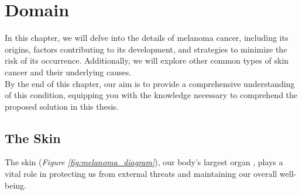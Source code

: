 \chapter{Domain}
\label{cap:problem_domain}

In this chapter, we will delve into the details of melanoma cancer, including its origins,
factors contributing to its development, and strategies to minimize the risk of its occurrence.
Additionally, we will explore other common types of skin cancer and their underlying causes. \\

By the end of this chapter, our aim is to provide a comprehensive understanding of this condition,
equipping you with the knowledge necessary to comprehend the proposed solution in this thesis.

\section{The Skin}

The skin (\textit{Figure \ref{fig:melanoma_diagram}}), our body's largest organ \cite{BaseCancerKnowledge},
plays a vital role in protecting us from external threats and maintaining our overall well-being.

